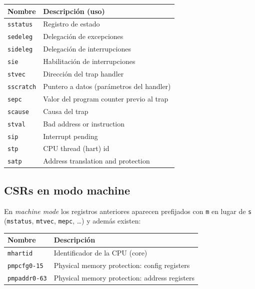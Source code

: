\documentclass[11pt,a4paper]{article}
\begin{document}
\begin{center}\small
\begin{tabular}{@{}ll@{}}
\toprule
\textbf{Nombre} & \textbf{Descripción (uso)} \\
\midrule
\texttt{sstatus}  & Registro de estado \\
\texttt{sedeleg}  & Delegación de excepciones \\
\texttt{sideleg}  & Delegación de interrupciones \\
\texttt{sie}      & Habilitación de interrupciones \\
\texttt{stvec}    & Dirección del trap handler \\
\texttt{sscratch} & Puntero a datos (parámetros del handler) \\
\texttt{sepc}     & Valor del program counter previo al trap \\
\texttt{scause}   & Causa del trap \\
\texttt{stval}    & Bad address or instruction \\
\texttt{sip}      & Interrupt pending \\
\texttt{stp}      & CPU thread (hart) id \\
\texttt{satp}     & Address translation and protection \\
\bottomrule
\end{tabular}
\end{center}

\subsection{CSRs en modo machine}

En \emph{machine mode} los registros anteriores aparecen prefijados
con \texttt{m} en lugar de \texttt{s} (\texttt{mstatus},
\texttt{mtvec}, \texttt{mepc}, \ldots) y además existen:

\begin{center}\small
\begin{tabular}{@{}ll@{}}
\toprule
\textbf{Nombre}     & \textbf{Descripción} \\
\midrule
\texttt{mhartid}        & Identificador de la CPU (core) \\
\texttt{pmpcfg0-15}     & Physical memory protection: config registers \\
\texttt{pmpaddr0-63}    & Physical memory protection: address registers \\
\bottomrule
\end{tabular}
\end{center}
\end{document}
